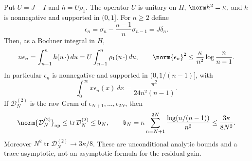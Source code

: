 \begin{proposition}
\label{prop:ns61-average-budget}
Put $U=J-I$ and $h=U\rho_1$. The operator $U$ is unitary on $H$,
$\norm h^2=\kappa$, and $h$ is nonnegative and supported in $(0,1]$.
For $n\geq2$ define
\[
 \epsilon_n=\sigma_n-\frac{n-1}{n}\sigma_{n-1}=J\delta_n.
\]
Then, as a Bochner integral in $H$,
\begin{equation}
 n\epsilon_n=\int_{n-1}^{n}h(u\,\cdot)\,du
       =U\int_{n-1}^{n}\rho_1(u\,\cdot)\,du,
 \qquad
 \norm{\epsilon_n}^2\leq
       \frac{\kappa}{n^2}\log\frac n{n-1}.
 \label{eq:ns61-average}
\end{equation}
In particular $\epsilon_n$ is nonnegative and supported in
$(0,1/(n-1)]$, with
\begin{equation}
 \int_0^\infty x\epsilon_n(x)\,dx
             =\frac{\pi^2}{24n^2(n-1)}.
 \label{eq:ns61-positive-first-moment}
\end{equation}
If $\mathcal D_N^{(2)}$ is the raw Gram of
$\epsilon_{N+1},\ldots,\epsilon_{2N}$, then
\begin{equation}
 \norm{\mathcal D_N^{(2)}}_{\rm op}
 \leq\operatorname{tr}\mathcal D_N^{(2)}\leq \mathfrak b_N,
 \qquad \mathfrak b_N=\kappa\sum_{n=N+1}^{2N}
          \frac{\log(n/(n-1))}{n^2}
 \leq\frac{3\kappa}{8N^2}.
 \label{eq:ns61-trace-budget}
\end{equation}
Moreover $N^2\operatorname{tr}\mathcal D_N^{(2)}\to3\kappa/8$.
These are unconditional analytic bounds and a trace asymptotic, not
an asymptotic formula for the residual gain.
\end{proposition}
